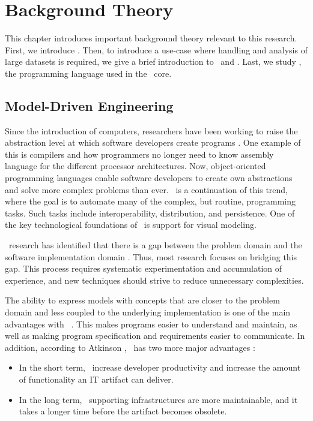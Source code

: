 \chapter{Background Theory}
\label{chap:background}
This chapter introduces important background theory relevant to this research. First, we introduce \mde. Then, to introduce a use-case where handling and analysis of large datasets is required, we give a brief introduction to \bi~and \bd. Last, we study \delphi, the programming language used in the \gap~core.

\clearpage


\section{Model-Driven Engineering}
\label{sec:Model-Driven Engineering}
Since the introduction of computers, researchers have been working to raise the abstraction level at which software developers create programs \cite{Atkinson2003-wr}. One example of this is compilers and how programmers no longer need to know assembly language for the different processor architectures. Now, object-oriented programming languages enable software developers to create own abstractions and solve more complex problems than ever. \mde~is a continuation of this trend, where the goal is to automate many of the complex, but routine, programming tasks. Such tasks include interoperability, distribution, and persistence. One of the key technological foundations of \mde~is support for visual modeling.

\mde~research has identified that there is a gap between the problem domain and the software implementation domain \cite{France2007-ae}. Thus, most research focuses on bridging this gap. This process requires systematic experimentation and accumulation of experience, and new techniques should strive to reduce unnecessary complexities.

The ability to express models with concepts that are closer to the problem domain and less coupled to the underlying implementation is one of the main advantages with \mde~\cite{Selic2003-qa}. This makes programs easier to understand and maintain, as well as making program specification and requirements easier to communicate.  In addition, according to Atkinson \ea, \mde~has two more major advantages \cite{Atkinson2003-wr}:
\begin{itemize}
    \item In the short term, \mde~increase developer productivity and increase the amount of functionality an IT artifact can deliver.
    \item In the long term, \mdd~supporting infrastructures are more maintainable, and it takes a longer time before the artifact becomes obsolete.
\end{itemize}

